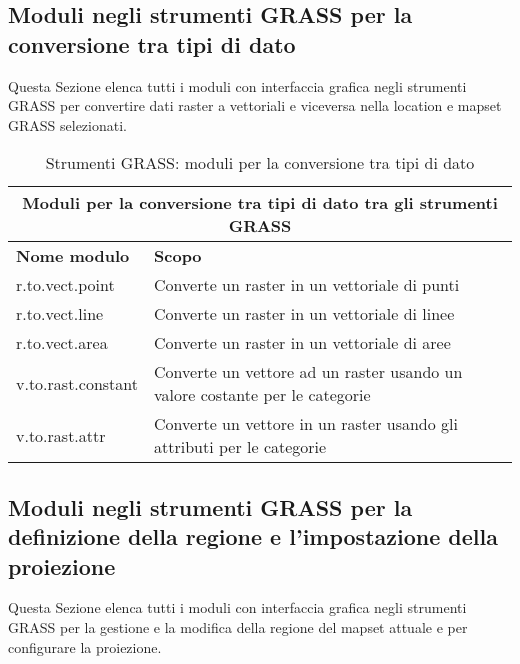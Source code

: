 \subsection{Moduli negli strumenti GRASS per la conversione tra tipi di dato}

Questa Sezione elenca tutti i moduli con interfaccia grafica negli strumenti GRASS per convertire dati raster a vettoriali e viceversa nella location e mapset GRASS selezionati.

\begin{table}[ht]
\centering
\caption{Strumenti GRASS: moduli per la conversione tra tipi di dato}\medskip
 \begin{tabular}{|p{4cm}|p{12cm}|}
  \hline \multicolumn{2}{|c|}{\textbf{Moduli per la conversione tra tipi di dato tra gli strumenti GRASS}} \\
  \hline \textbf{Nome modulo} & \textbf{Scopo} \\
  \hline r.to.vect.point & Converte un raster in un vettoriale di punti \\
  \hline r.to.vect.line & Converte un raster in un vettoriale di linee \\
  \hline r.to.vect.area & Converte un raster in un vettoriale di aree \\
  \hline v.to.rast.constant & Converte un vettore ad un raster usando un valore costante per le categorie\\
  \hline v.to.rast.attr & Converte un vettore in un raster  usando gli attributi per le categorie \\
\hline
\end{tabular}
\end{table}

\subsection{Moduli negli strumenti GRASS per la definizione della regione e l'impostazione della proiezione}

Questa Sezione elenca tutti i moduli con interfaccia grafica negli strumenti GRASS per la gestione e la modifica della regione del mapset attuale e per configurare la proiezione.

